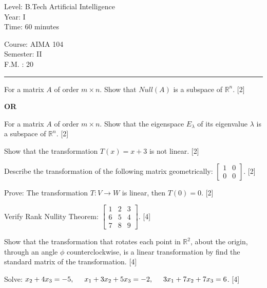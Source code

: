 \documentclass[12pt]{exam}
\begin{document}
\begin{minipage}{0.70\linewidth}
  \begin{flushleft}
    Level: B.Tech Artificial Intelligence \\
    Year: I \\
    Time: 60 minutes
  \end{flushleft}
\end{minipage} \hfill
\begin{minipage}{0.25\linewidth}
  \begin{flushleft}
    Course: AIMA 104 \\
    Semester: II \\
    F.M. : 20
  \end{flushleft}
\end{minipage}
\vskip 2mm
\rule{\textwidth}{1pt}
\vskip 2mm

\begin{questions}
\question For a matrix $A$ of order $m \times n$. Show that $Null(A)$ is a subspace of $\mathbb{R}^n$. [2]
  \begin{center}
    \bfseries OR
  \end{center}
  For a matrix $A$ of order $m \times n$. Show that the eigenspace $E_{\lambda}$ of its eigenvalue $\lambda$ is a subspace of $\mathbb{R}^n$. [2]

  \question Show that the transformation $T(x)=x+3$ is not linear. [2]

  \question Describe the transformation of the following matrix geometrically:
  $\begin{bmatrix}
    1 & 0\\
    0 & 0
  \end{bmatrix}$. [2]
\end{questions}
\newpage

\begin{questions}
  \setcounter{question}{3}
\question Prove: The transformation $T: V \to W$ is linear, then $T(0)=0$. [2]

  \question Verify Rank Nullity Theorem: $\displaystyle \begin{bmatrix}
    1 & 2 & 3 \\
    6 & 5 &4 \\
    7 & 8 & 9
\end{bmatrix}.$ [4]

\question Show that the transformation that rotates each point in $\mathbb{R}^2$, about the origin, through an angle $\phi$ counterclockwise, is a linear transformation by find the standard matrix of the transformation. [4]

\question Solve: \hspace{2mm} $x_2+4x_3 = -5, \hspace{5mm} x_1+3x_2+5x_3 = -2, \hspace{5mm} 3x_1 + 7x_2 + 7x_3 = 6$. [4]
\end{questions}
\vspace{9cm}
\end{document}
